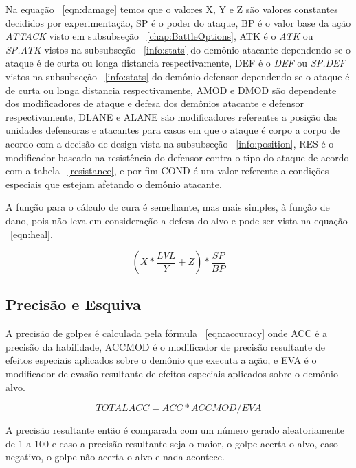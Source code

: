 	Na equação ~\ref{eqn:damage} temos que o valores X, Y e Z são valores constantes decididos por experimentação, SP é o poder do ataque, BP é o valor base da ação \emph{ATTACK} visto em subsubseção ~\ref{chap:BattleOptions}, ATK é o \emph{ATK} ou \emph{SP.ATK} vistos na subsubseção ~\ref{info:stats} do demônio atacante dependendo se o ataque é de curta ou longa distancia respectivamente, DEF é o \emph{DEF} ou \emph{SP.DEF} vistos na subsubseção ~\ref{info:stats} do demônio defensor dependendo se o ataque é de curta ou longa distancia respectivamente, AMOD e DMOD são dependente dos modificadores de ataque e defesa dos demônios atacante e defensor respectivamente, DLANE e ALANE são modificadores referentes a posição das unidades defensoras e atacantes para casos em que o ataque é corpo a corpo de acordo com a decisão de design vista na subsubseção ~\ref{info:position}, RES é o modificador baseado na resistência do defensor contra o tipo do ataque de acordo com a tabela ~\ref{resistance}, e por fim COND é um valor referente a condições especiais que estejam afetando o demônio atacante.
	
	A função para o cálculo de cura é semelhante, mas mais simples, à função de dano, pois não leva em consideração a defesa do alvo e pode ser vista na equação ~\ref{eqn:heal}.

\begin{equation}
\label{eqn:heal}
(X*\frac{LVL}{Y} + Z) * \frac{SP}{BP} 
\end{equation}


\subsection{Precisão e Esquiva}

A precisão de golpes é calculada pela fórmula ~\ref{eqn:accuracy} onde ACC é a precisão da habilidade, ACCMOD é o modificador de precisão resultante de efeitos especiais aplicados sobre o demônio que executa a ação, e EVA é o modificador de evasão resultante de efeitos especiais aplicados sobre o demônio alvo.

\begin{equation}
\label{eqn:accuracy}
TOTALACC = ACC * ACCMOD / EVA
\end{equation}

	A precisão resultante então é comparada com um número gerado aleatoriamente de 1 a 100 e caso a precisão resultante seja o maior, o golpe acerta o alvo, caso negativo, o golpe não acerta o alvo e nada acontece.

